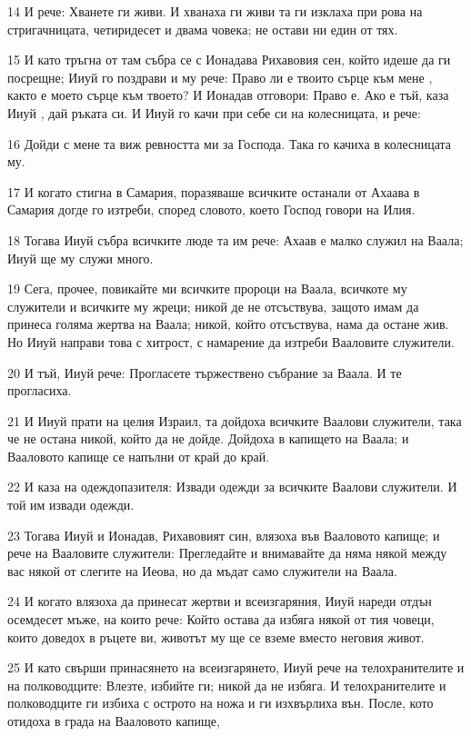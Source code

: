 \par 14 И рече: Хванете ги живи. И хванаха ги живи та ги изклаха при рова на стригачницата, четиридесет и двама човека; не остави ни един от тях.
\par 15 И като тръгна от там събра се с Ионадава Рихавовия сен, който идеше да ги посрещне; Ииуй го поздрави и му рече: Право ли е твоито сърце към мене , както е моето сърце към твоето? И Ионадав отговори: Право е. Ако е тъй, каза Ииуй , дай ръката си. И Ииуй го качи при себе си на колесницата, и рече:
\par 16 Дойди с мене та виж ревността ми за Господа. Така го качиха в колесницата му.
\par 17 И когато стигна в Самария, поразяваше всичките останали от Ахаава в Самария догде го изтреби, според словото, което Господ говори на Илия.
\par 18 Тогава Ииуй събра всичките люде та им рече: Ахаав е малко служил на Ваала; Ииуй ще му служи много.
\par 19 Сега, прочее, повикайте ми всичките пророци на Ваала, всичкоте му служители и всичките му жреци; никой де не отсъствува, защото имам да принеса голяма жертва на Ваала; никой, който отсъствува, нама да остане жив. Но Ииуй направи това с хитрост, с намарение да изтреби Вааловите служители.
\par 20 И тъй, Ииуй рече: Прогласете тържествено събрание за Ваала. И те прогласиха.
\par 21 И Ииуй прати на целия Израил, та дойдоха всичките Ваалови служители, така че не остана никой, който да не дойде. Дойдоха в капището на Ваала; и Вааловото капище се напълни от край до край.
\par 22 И каза на одеждопазителя: Извади одежди за всичките Ваалови служители. И той им извади одежди.
\par 23 Тогава Ииуй и Ионадав, Рихавовият син, влязоха във Вааловото капище; и рече на Вааловите служители: Прегледайте и внимавайте да няма някой между вас някой от слегите на Иеова, но да мъдат само служители на Ваала.
\par 24 И когато влязоха да принесат жертви и всеизгаряния, Ииуй нареди отдън осемдесет мъже, на които рече: Който остава да избяга някой от тия човеци, които доведох в ръцете ви, животът му ще се вземе вместо неговия живот.
\par 25 И като свърши принасянето на всеизгарянето, Ииуй рече на телохранителите и на полководците: Влезте, избийте ги; никой да не избяга. И телохранителите и полководците ги избиха с острото на ножа и ги изхвърлиха вън. После, кото отидоха в града на Вааловото капище,
